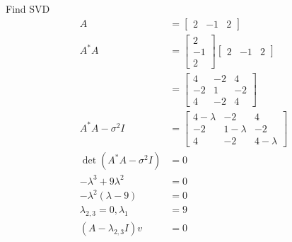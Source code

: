 \documentclass[12pt, letterpaper]{article}
\begin{document}
Find SVD
\begin{align*}
    A &= \begin{bmatrix} 2 & -1 & 2 \end{bmatrix} \\
    A^*A &= \begin{bmatrix} 2 \\ -1 \\ 2 \end{bmatrix}\begin{bmatrix} 2 & -1 & 2 \end{bmatrix} \\
    &= \begin{bmatrix} 4 & -2 & 4 \\ -2 & 1 & -2 \\ 4 & -2 & 4 \end{bmatrix} \\
    A^*A - \sigma^2 I &= \begin{bmatrix} 4 - \lambda & -2 & 4 \\ -2 & 1 - \lambda & -2 \\ 4 & -2 & 4 - \lambda \end{bmatrix} \\
    \det(A^*A - \sigma^2 I) &= 0 \\
    -\lambda^3 + 9 \lambda^2 &= 0 \\
    -\lambda^2(\lambda - 9) &= 0 \\
    \lambda_{2,3} = 0, \lambda_1 &= 9 \\
    (A - \lambda_{2,3} I) v &= 0
\end{align*}
\end{document}
